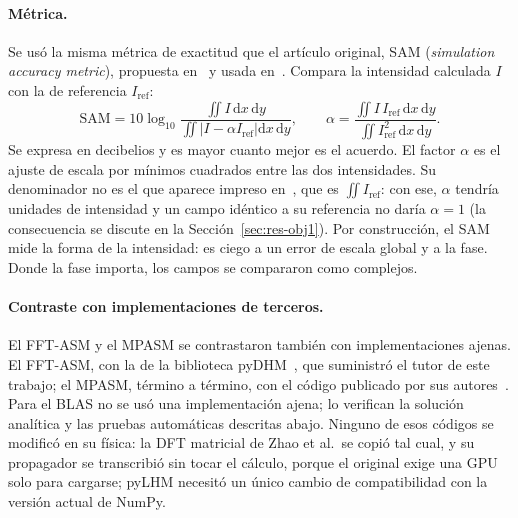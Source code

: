 \paragraph{Métrica.} Se usó la misma métrica de exactitud que el artículo
original, SAM (\emph{simulation accuracy metric}), propuesta
en~\cite{yu2012} y usada en~\cite{zhao2020}. Compara la intensidad calculada
$I$ con la de referencia $I_\mathrm{ref}$:
\begin{equation}
  \mathrm{SAM} = 10\log_{10}\frac{\iint I\,\mathrm{d}x\,\mathrm{d}y}
  {\iint \left|I - \alpha I_\mathrm{ref}\right| \mathrm{d}x\,\mathrm{d}y},
  \qquad
  \alpha = \frac{\iint I\, I_\mathrm{ref}\,\mathrm{d}x\,\mathrm{d}y}
  {\iint I_\mathrm{ref}^2\,\mathrm{d}x\,\mathrm{d}y}.
  \label{eq:sam}
\end{equation}
Se expresa en decibelios y es mayor cuanto mejor es el acuerdo. El factor
$\alpha$ es el ajuste de escala por mínimos cuadrados entre las dos
intensidades. Su denominador no es el que aparece impreso
en~\cite{zhao2020}, que es $\iint I_\mathrm{ref}$: con ese, $\alpha$ tendría
unidades de intensidad y un campo idéntico a su referencia no daría
$\alpha = 1$ (la consecuencia se discute en la
Sección~\ref{sec:res-obj1}). Por construcción, el SAM mide la forma de la
intensidad: es ciego a un error de escala global y a la fase. Donde la fase
importa, los campos se compararon como complejos.

\paragraph{Contraste con implementaciones de terceros.} El FFT-ASM y el MPASM
se contrastaron también con implementaciones ajenas. El FFT-ASM, con la de la
biblioteca pyDHM~\cite{castaneda2022}, que suministró el tutor de este trabajo;
el MPASM, término a término, con el código publicado por sus
autores~\cite{zhao2020code}. Para el BLAS no se usó una
implementación ajena; lo verifican la solución analítica y las pruebas
automáticas descritas abajo. Ninguno de esos códigos se modificó en su
física: la DFT matricial de Zhao et al.\ se copió tal cual, y su propagador se
transcribió sin tocar el cálculo, porque el original exige una GPU solo para
cargarse; pyLHM necesitó un único cambio de compatibilidad con la versión
actual de NumPy.

